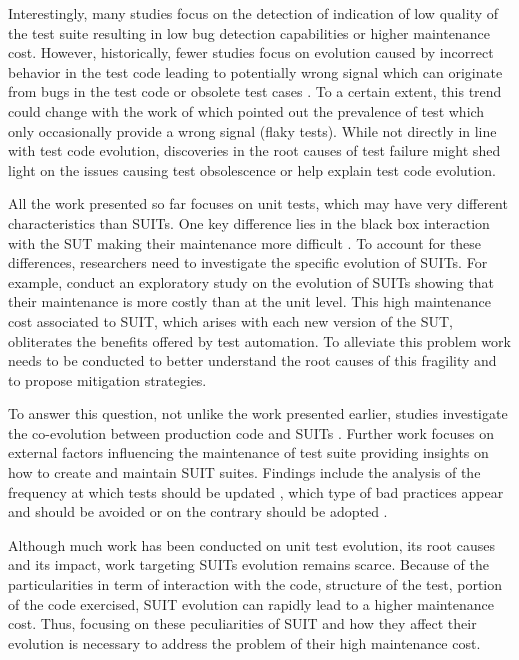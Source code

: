 Interestingly, many studies focus on the detection of indication of low quality of the test suite resulting in low bug detection capabilities or higher maintenance cost. However, historically, fewer studies focus on evolution caused by incorrect behavior in the test code leading to potentially wrong signal which can originate from bugs in the test code \cite{Vahabzadeh2015} or obsolete test cases \cite{Hao2013, Tang2015}. To a certain extent, this trend could change with the work of \textcite{Luo2014} which pointed out the prevalence of test which only occasionally provide a wrong signal (flaky tests). While not directly in line with test code evolution, discoveries in the root causes of test failure might shed light on the issues causing test obsolescence or help explain test code evolution.

All the work presented so far focuses on unit tests, which may have very different characteristics than SUITs. One key difference lies in the black box interaction with the SUT making their maintenance more difficult \cite{Berner2005}. To account for these differences, researchers need to investigate the specific evolution of SUITs. For example, \textcite{Skoglund2004} conduct an exploratory study on the evolution of SUITs showing that their maintenance is more costly than at the unit level. This high maintenance cost associated to SUIT, which arises with each new version of the SUT, obliterates the benefits offered by test automation. To alleviate this problem work needs to be conducted to better understand the root causes of this fragility and to propose mitigation strategies.

To answer this question, not unlike the work presented earlier, studies investigate the co-evolution between production code and SUITs \cite{Shewchuk2010, Christophe2014}. Further work focuses on external factors influencing the maintenance of test suite \cite{Alegroth2013, Kan2013, Alegroth2016, Lavoie2017} providing insights on how to create and maintain SUIT suites. Findings include the analysis of the frequency at which tests should be updated \cite{Alegroth2013, Alegroth2016}, which type of bad practices appear and should be avoided \cite{Chen2012, Lavoie2017} or on the contrary should be adopted \cite{Kan2013}.

Although much work has been conducted on unit test evolution, its root causes and its impact, work targeting SUITs evolution remains scarce. Because of the particularities in term of interaction with the code, structure of the test, portion of the code exercised, SUIT evolution can rapidly lead to a higher maintenance cost. Thus, focusing on these peculiarities of SUIT and how they affect their evolution is necessary to address the problem of their high maintenance cost.

